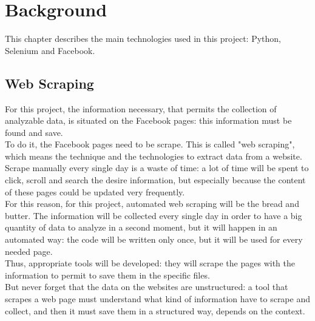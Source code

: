 

\chapter{Background}
\label{cap:background}
This chapter describes the main technologies used in this project: Python, Selenium and Facebook.
\section{Web Scraping}
For this project, the information necessary, that permits the collection of analyzable data, is situated on the Facebook pages: this information must be found and save.\\To do it, the Facebook pages need to be scrape. This is called "web scraping", which means the technique and the technologies to extract data from a website.\\
Scrape manually every single day is a waste of time: a lot of time will be spent to click, scroll and search the desire information, but especially because the content of these pages could be updated very frequently.\\
For this reason, for this project, automated web scraping will be the bread and butter. The information will be collected every single day in order to have a big quantity of data to analyze in a second moment, but it will happen in an automated way: the code will be written only once, but it will be used for every needed page.\\
Thus, appropriate tools will be developed: they will scrape the pages with the information to permit to save them in the specific files.\\
But never forget that the data on the websites are unstructured: a tool that scrapes a web page must understand what kind of information have to scrape and collect, and then it must save them in a structured way, depends on the context.

